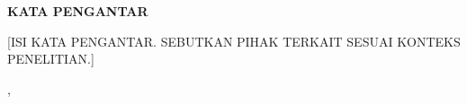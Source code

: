 \clearpage
{}
{}
\begin{center}\textbf{\large KATA PENGANTAR}\end{center}
\vspace{1cm}
[ISI KATA PENGANTAR. SEBUTKAN PIHAK TERKAIT SESUAI KONTEKS PENELITIAN.]

\begin{flushright}
\kota, \tglpengesahan\\[1.5cm]
\penulis\\
\nim
\end{flushright}
